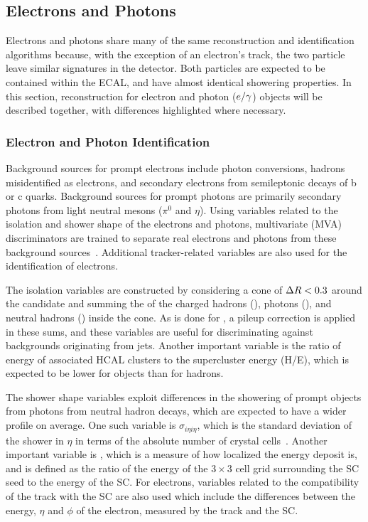 \subsection{Electrons and Photons}\label{sec:eg_reco}
Electrons and photons share many of the same reconstruction and identification algorithms because, with the exception of an electron's track, the two particle leave similar signatures in the detector. Both particles are expected to be contained within the ECAL, and have almost identical showering properties. In this section, reconstruction for electron and photon ($e/\gamma$) objects will be described together, with differences highlighted where necessary.

\subsubsection{Electron and Photon Identification}\label{sec:eg_id}

Background sources for prompt electrons include photon conversions, hadrons misidentified as electrons, and secondary electrons from semileptonic decays of b or c quarks. Background sources for prompt photons are primarily secondary photons from light neutral mesons ($\pi^0$ and $\eta$). Using variables related to the isolation and shower shape of the electrons and photons, multivariate (MVA) discriminators are trained to separate real electrons and photons from these background sources~\cite{CMS:2020uim}. Additional tracker-related variables are also used for the identification of electrons.

The isolation variables are constructed by considering a cone of $\Delta R<0.3$ around the \eg candidate and summing the \pt of the charged hadrons (\Ich), photons (\Iph), and neutral hadrons (\In) inside the cone. As is done for \IPF, a pileup correction is applied in these sums, and these variables are useful for discriminating against backgrounds originating from jets. Another important variable is the ratio of energy of associated HCAL clusters to the supercluster energy (H/E), which is expected to be lower for \eg objects than for hadrons.

The shower shape variables exploit differences in the showering of prompt \eg objects from photons from neutral hadron decays, which are expected to have a wider profile on average. One such variable is $\sigma_{i\eta i\eta}$, which is the standard deviation of the shower in $\eta$ in terms of the absolute number of crystal cells~\cite{CMS:2020uim}. Another important variable is \RNINE, which is a measure of how localized the energy deposit is, and is defined as the ratio of the energy of the $3\times3$ cell grid surrounding the SC seed to the energy of the SC. For electrons, variables related to the compatibility of the track with the SC are also used which include the differences between the energy, $\eta$ and $\phi$ of the electron, measured by the track and the SC.

